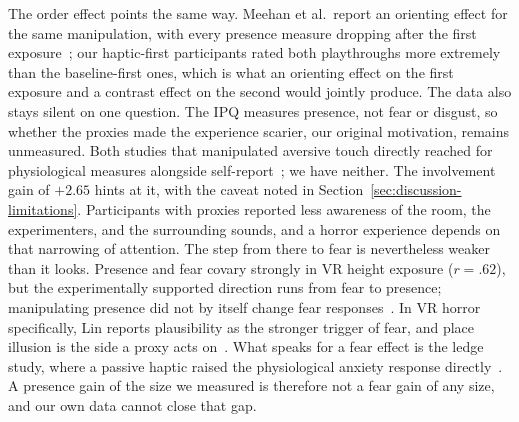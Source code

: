 The order effect points the same way. Meehan et al.\ report an orienting effect for the same manipulation, with every presence measure dropping after the first exposure~\cite{Meehan.2002}; our haptic-first participants rated both playthroughs more extremely than the baseline-first ones, which is what an orienting effect on the first exposure and a contrast effect on the second would jointly produce. The data also stays silent on one question. The IPQ measures presence, not fear or disgust, so whether the proxies made the experience scarier, our original motivation, remains unmeasured. Both studies that manipulated aversive touch directly reached for physiological measures alongside self-report~\cite{Brice.2021, Cong.2025}; we have neither. The involvement gain of $+2.65$ hints at it, with the caveat noted in Section~\ref{sec:discussion-limitations}. Participants with proxies reported less awareness of the room, the experimenters, and the surrounding sounds, and a horror experience depends on that narrowing of attention. The step from there to fear is nevertheless weaker than it looks. Presence and fear covary strongly in VR height exposure ($r = .62$), but the experimentally supported direction runs from fear to presence; manipulating presence did not by itself change fear responses~\cite{Gromer.2019}. In VR horror specifically, Lin reports plausibility as the stronger trigger of fear, and place illusion is the side a proxy acts on~\cite{Lin.2017}. What speaks for a fear effect is the ledge study, where a passive haptic raised the physiological anxiety response directly~\cite{Meehan.2002, Slater.2009}. A presence gain of the size we measured is therefore not a fear gain of any size, and our own data cannot close that gap.




